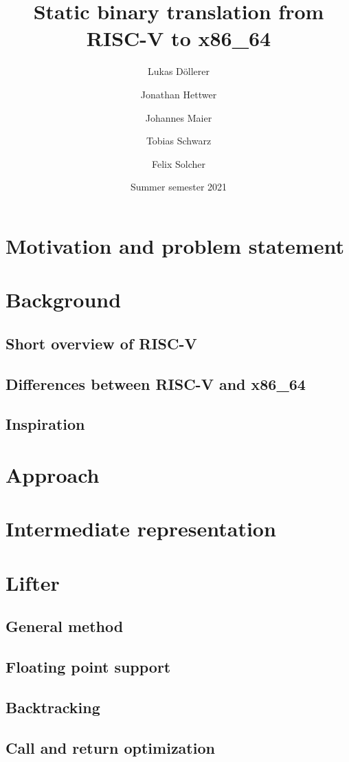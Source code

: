 \documentclass[course=eragp]{aspdoc}
\author{Lukas Döllerer \and Jonathan Hettwer \and Johannes Maier \and Tobias Schwarz \and Felix Solcher}
\date{Summer semester 2021}
\title{Static binary translation from RISC-V to x86\_64}
\begin{document}
\maketitle

\section{Motivation and problem statement}

\section{Background}
\subsection{Short overview of RISC-V}
\subsection{Differences between RISC-V and x86\_64}
\subsection{Inspiration}

\section{Approach}

\section{Intermediate representation}

\section{Lifter}
\subsection{General method}
\subsection{Floating point support}
\subsection{Backtracking}
\subsection{Call and return optimization}
\end{document}
